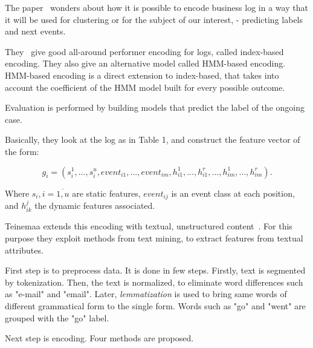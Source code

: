 The paper~\cite{Leontjeva2015} wonders about how it is possible to encode business log in a way that it will be used for clustering or for the subject of our interest, - predicting labels and next events.

They~\cite{Leontjeva2015} give good all-around performer encoding for logs, called index-based encoding. They also give an alternative model called HMM-based encoding. HMM-based encoding is a direct extension to index-based, that takes into account the coefficient of the HMM model built for every possible outcome.

Evaluation is performed by building models that predict the label of the ongoing case.

Basically, they look at the log as in Table 1, and construct the feature vector of the form:

\[g_i = (s_i^1,...,s_i^u,event_{i1},...,event_{im},h_{i1}^1,...,h_{i1}^r,...,h_{im}^1,...,h_{im}^r).\]

Where $s_i, i=\overline{1,u}$ are static features, $event_{ij}$ is an event class at each position, and $h_{ik}^{j}$ the dynamic features associated. 

Teinemaa extends this encoding with textual, unstructured content~\cite{DBLP:conf/bpm/TeinemaaDMF16}. For this purpose they exploit methods from text mining, to extract features from textual attributes.

First step is to preprocess data. It is done in few steps. Firstly, text is segmented by tokenization. Then, the text is normalized, to eliminate word differences such as "e-mail" and "email". Later, \textit{lemmatization} is used to bring same words of different grammatical form to the single form. Words such as "go" and "went" are grouped with the "go" label.

Next step is encoding. Four methods are proposed.

